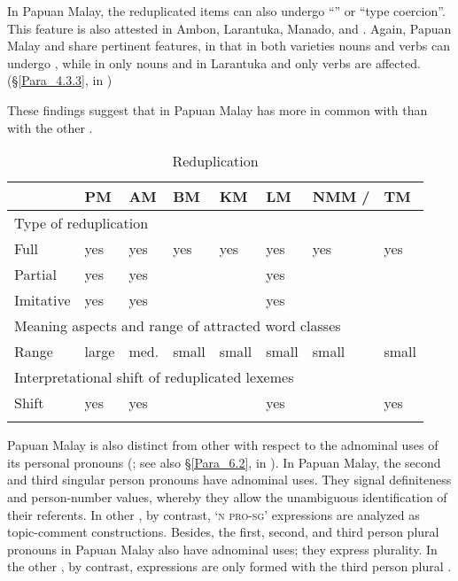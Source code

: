 {In Papuan Malay, the reduplicated items can also undergo  ``'' or  ``type coercion''. This feature is also attested in Ambon, Larantuka, Manado, and . Again, Papuan Malay and  share pertinent features, in that in both varieties nouns and verbs can undergo , while in  only nouns and in Larantuka and  only verbs are affected. (§\ref{Para_4.3.3}, in )



These findings suggest that  in Papuan Malay has more in common with  than with the other .


\begin{table}
\caption{Reduplication}\label{Table_1.8}

\begin{tabular}{llllllll}
\lsptoprule
 & PM & AM & BM & KM & LM &  {NMM /} &  {TM}\\
\midrule

\multicolumn{8}{l}{Type of reduplication}\\
\midrule
Full & yes & yes & yes & yes & yes & yes &  yes\\
Partial & yes & yes &  &  & yes &  & \\
Imitative & yes & yes &  &  & yes &  & \\
\midrule
\multicolumn{8}{l}{Meaning aspects and range of attracted word classes}\\
\midrule
Range & large & med. & small & small & small & small &  small\\
\midrule
\multicolumn{8}{l}{Interpretational shift of reduplicated lexemes}\\
\midrule
Shift & yes & yes &  &  & yes &  &  yes\\
\lspbottomrule
\end{tabular}
\end{table}

\largerpage
Papuan Malay is also distinct from other  with respect to the adnominal uses of its personal pronouns (; see also §\ref{Para_6.2}, in ). In Papuan Malay, the second and third singular person pronouns have adnominal uses. They signal definiteness and person-number values, whereby they allow the unambiguous identification of their referents. In other , by contrast, ‘\textsc{n} \textsc{pro-sg}’ expressions are analyzed as topic-comment constructions. Besides, the first, second, and third person plural pronouns in Papuan Malay also have adnominal uses; they express  plurality. In the other , by contrast,  expressions are only formed with the third person plural .

}
